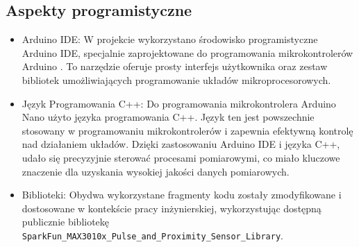 \subsection{Aspekty programistyczne}
\begin{itemize}
  \item Arduino IDE: W projekcie wykorzystano środowisko programistyczne Arduino IDE, specjalnie zaprojektowane do programowania mikrokontrolerów Arduino \cite{arduino}. To narzędzie oferuje prosty interfejs użytkownika oraz zestaw bibliotek umożliwiających programowanie układów mikroprocesorowych.
  \item Język Programowania C++: Do programowania mikrokontrolera Arduino Nano użyto języka programowania C++. Język ten jest powszechnie stosowany w programowaniu mikrokontrolerów i zapewnia efektywną kontrolę nad działaniem układów. Dzięki zastosowaniu Arduino IDE i języka C++, udało się precyzyjnie sterować procesami pomiarowymi, co miało kluczowe znaczenie dla uzyskania wysokiej jakości danych pomiarowych.
  \item Biblioteki: Obydwa wykorzystane fragmenty kodu zostały zmodyfikowane i dostosowane w kontekście pracy inżynierskiej, wykorzystując dostępną publicznie bibliotekę \lstinline[language=C,basicstyle=\ttfamily]{SparkFun_MAX3010x_Pulse_and_Proximity_Sensor_Library}.
\end{itemize}

